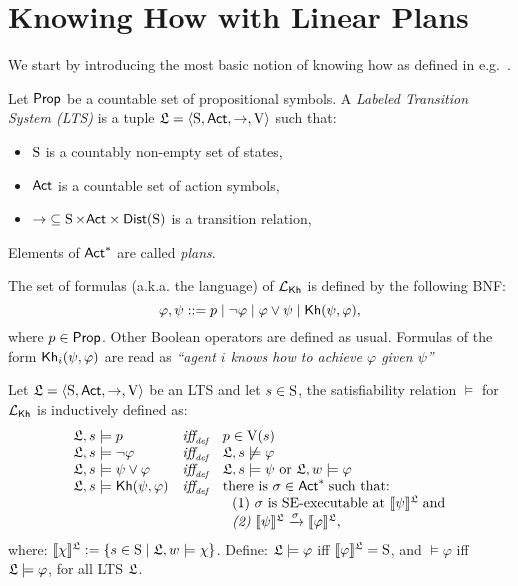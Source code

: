 \section{Knowing How with Linear Plans}
\label{sec:khlinearplans}

We start by introducing the most basic notion of knowing how as defined in e.g.~\cite{Wang15lori,Wang16,Wang2016}.


\begin{definition}\label{def:lts}
    Let $\PROP$ be a countable set of propositional symbols. 
    A \emph{Labeled Transition System (LTS)}  is a tuple
    $\model=\tup{\S,\ACT,\ra,\V}$ such that:
    \begin{itemize}
        \item $\S$ is a countably non-empty set of states,
        \item $\ACT$ is a countable set of action symbols,
        \item ${\ra} \subseteq \S \times \ACT \times \dist(\S)$ is a transition relation,
    \end{itemize}
    Elements of $\ACT^*$ are called \emph{plans}.
\end{definition}

\begin{definition}
    \label{def:syntax}
    The set of formulas (a.k.a. the language) of $\Khlogic$ is defined by the following BNF:
    \[
        \varphi, \psi ::= p \mid \neg \varphi \mid \varphi \vee \psi \mid \kh(\psi,\varphi),
    \]
    where $p\in\PROP$. Other Boolean operators are defined as usual. Formulas of the form $\kh_i(\psi,\varphi)$ are read as \emph{``agent $i$ knows how to achieve $\varphi$ given $\psi$''}
\end{definition}

\begin{definition} \label{def:semantics-kh}
    Let $\model = \tup{\S,\ACT,\ra,\V}$ be an LTS and let $s\in\S$, the satisfiability relation $\models$ for $\Khlogic$ is inductively defined as:
    \[
    \begin{array}{l@{\ \ \ }c@{\ \ \  }l}
    \model, s \models p & \iffdef & p \in \V(s) \\
    \model, s\models \neg\varphi & \iffdef & \model, s \not\models \varphi \\
    \model, s \models \psi\vee\varphi & \iffdef & \model, s \models \psi \mbox{ or }\model, w \models \varphi \\
    \model, s \models \kh(\psi,\varphi) & \iffdef & \text{there is } \plan \in \ACT^* \;\text{such that:} \\
    & & \ \ \text{\rm (1)} \ \plan \text{ is SE-executable at }  \truthset{\model}{\psi}\; \text{and} \\
    & & \ \ \text{\em (2)} \ \truthset{\model}{\psi} \reach{\plan} \truthset{\model}{\varphi}, 
    \end{array}
    \]      where: $\truthset{\model}{\chi} := \csetsc{s\in\S}{\model,w\models\chi}$. Define: $\model\models\varphi$ iff  $\truthset{\model}{\varphi}=\S$, and $\models\varphi$ iff $\model\models\varphi$, for all LTS $\model$.
\end{definition}

